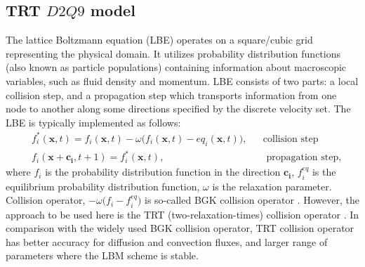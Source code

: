 \documentclass{article}
\begin{document}
\subsection{TRT $D2Q9$ model}
The lattice Boltzmann equation (LBE) operates on a square/cubic grid representing the
physical domain. It utilizes
probability distribution functions (also known as particle populations)
containing information about
macroscopic variables, such as fluid density and momentum. LBE consists of
two parts: a local collision step, and a propagation step which transports
information from one node to another along some 
directions specified by the discrete velocity set.
The LBE is typically implemented as follows:
\begin{equation}
\label{standard:implementation}
\begin{aligned}
&f_i^{*}(\bm{x},t)= f_i(\bm{x},t)-\omega \bigl(f_i(\bm{x},t)-eq_i(\bm{x},t)\bigr),&&\text{
collision step}\\
&f_i(\bm{x}+\bm{c_i},t+1)=f_i^{*}(\bm{x},t),&&\text{ propagation step}, 
\end{aligned}
\end{equation}
where $f_i$ is the probability distribution function in the direction $\bm{c_i}$,
 $f_i^{eq}$ is the equilibrium probability distribution function, $\omega$ is the
relaxation parameter. Collision operator, $-\omega \bigl(f_i- f_i^{eq}\bigr)$ is so-called BGK
collision operator \cite{bgk}. However, the approach to be used here is the TRT
(two-relaxation-times) collision operator \cite{ginzburg-main,ginzburg-saturated-flow}. In
comparison with the widely used BGK collision operator, TRT collision operator has better accuracy
for diffusion and convection fluxes, and larger range of parameters where the LBM scheme is stable.
\end{document}
